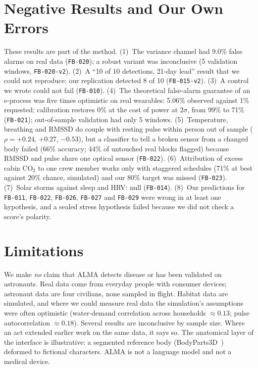 \documentclass[conference]{IEEEtran}
\newcommand{\act}[1]{\texttt{FB-#1}}
\begin{document}
\section{Negative Results and Our Own Errors}\label{sec:neg}
These results are part of the method. (1)~The variance channel had 9.0\% false alarms on real data (\act{020}); a robust variant was inconclusive (5 validation windows, \act{020-v2}). (2)~A ``10 of 10 detections, 21-day lead'' result that we could not reproduce: our replication detected 8 of 10 (\act{015-v2}). (3)~A control we wrote could not fail (\act{010}). (4)~The theoretical false-alarm guarantee of an e-process was five times optimistic on real wearables: 5.06\% observed against 1\% requested; calibration restores 0\% at the cost of power at $2\sigma$, from 99\% to 71\% (\act{021}); out-of-sample validation had only 5 windows. (5)~Temperature, breathing and RMSSD do couple with resting pulse within person out of sample ($\rho=+0.24$, $+0.27$, $-0.53$), but a classifier to tell a broken sensor from a changed body failed (66\% accuracy; 44\% of untouched real blocks flagged) because RMSSD and pulse share one optical sensor (\act{022}). (6)~Attribution of excess cabin CO$_2$ to one crew member works only with staggered schedules (71\% at best against 20\% chance, simulated) and our 80\% target was missed (\act{023}). (7)~Solar storms against sleep and HRV: null (\act{014}). (8)~Our predictions for \act{011}, \act{022}, \act{026}, \act{027} and \act{029} were wrong in at least one hypothesis, and a sealed stress hypothesis failed because we did not check a score's polarity.

\section{Limitations}
We make \emph{no} claim that ALMA detects disease or has been validated on astronauts. Real data come from everyday people with consumer devices; astronaut data are four civilians, none sampled in flight. Habitat data are simulated, and where we could measure real data the simulation's assumptions were often optimistic (water-demand correlation across households $\approx0.13$; pulse autocorrelation $\approx0.18$). Several results are inconclusive by sample size. Where an act extended earlier work on the same data, it says so. The anatomical layer of the interface is illustrative: a segmented reference body (BodyParts3D~\cite{bp3d}) deformed to fictional characters. ALMA is not a language model and not a medical device.
\end{document}
